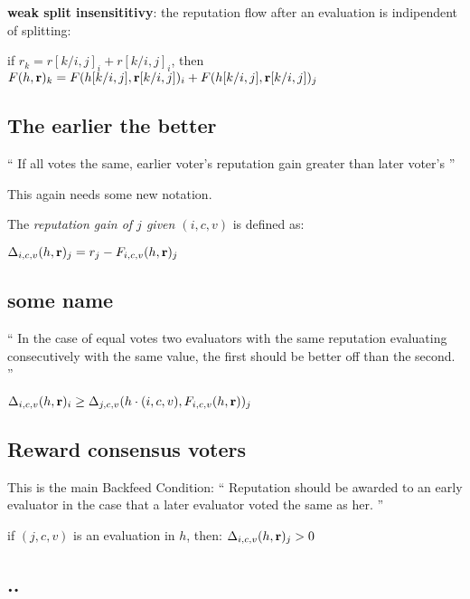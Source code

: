 \documentclass{article}
\begin{document}
{\bf weak split insensititivy}: the reputation flow after an evaluation is indipendent of splitting:
\begin{center}
if $r_k = r[k/{i,j}]_i +r[k/{i,j}]_i$, then $F(h, {\bf r})_k = F(h[k/{i,j}], {\bf r}[k/{i,j}])_i + F(h[k/{i,j}], {\bf r}[k/{i,j}])_j$
\end{center}


\subsection{The earlier the better}

``
If all votes the same, earlier voter’s reputation gain greater than later voter’s
''

This again needs some new notation. 

The {\em reputation gain of $j$ given $(i, c, v)$} is defined as:
\begin{center}
 $ \Delta_{i, c, v}(h, {\bf r})_j = r_j -  F_{i, c, v}(h, {\bf r})_j$
\end{center}



\subsection{some name}

``
In the case of equal votes two evaluators with the same reputation evaluating consecutively with the same value, the first should be better off than the second.
''

\begin{center}
$\Delta_{i, c, v}(h, {\bf r})_i \ge \Delta_{j, c, v}(h\cdot(i,c,v), F_{i,c,v}(h, {\bf r}))_j$
\end{center}

\subsection{Reward consensus voters}

This is the main Backfeed Condition:
``
Reputation should be awarded to an early evaluator in the case that a later evaluator voted the same as her.
''
\begin{center}
if $(j, c, v)$ is an evaluation in $h$, then:
$\Delta_{i, c, v}(h, {\bf r})_j > 0$
\end{center}

\subsection{..}
\end{document}
